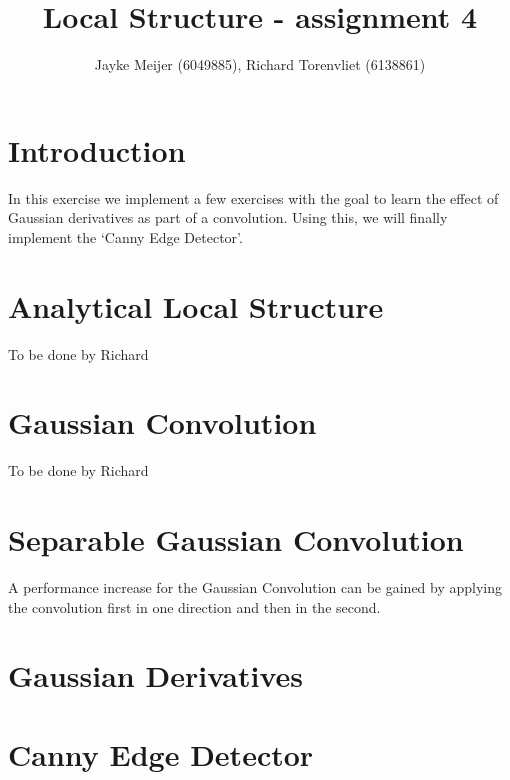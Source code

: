 \documentclass[10pt,a4paper]{article}
\title{Local Structure - assignment 4}
\author{Jayke Meijer (6049885), Richard Torenvliet (6138861)}
\begin{document}
\maketitle

\section{Introduction}

In this exercise we implement a few exercises with the goal to learn 
the effect of Gaussian derivatives as part of a convolution. Using this,
we will finally implement the `Canny Edge Detector'.

\section{Analytical Local Structure}

To be done by Richard

\section{Gaussian Convolution}

To be done by Richard

\section{Separable Gaussian Convolution}

A performance increase for the Gaussian Convolution can be gained by
applying the convolution first in one direction and then in the
second.

\section{Gaussian Derivatives}



\section{Canny Edge Detector}
\end{document}
